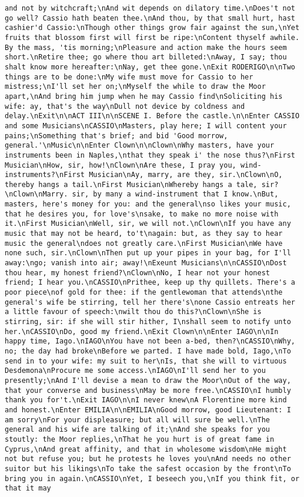 \begin{verbatim}
and not by witchcraft;\nAnd wit depends on dilatory time.\nDoes't not go well? Cassio hath beaten thee.\nAnd thou, by that small hurt, hast cashier'd Cassio:\nThough other things grow fair against the sun,\nYet fruits that blossom first will first be ripe:\nContent thyself awhile. By the mass, 'tis morning;\nPleasure and action make the hours seem short.\nRetire thee; go where thou art billeted:\nAway, I say; thou shalt know more hereafter:\nNay, get thee gone.\nExit RODERIGO\n\nTwo things are to be done:\nMy wife must move for Cassio to her mistress;\nI'll set her on;\nMyself the while to draw the Moor apart,\nAnd bring him jump when he may Cassio find\nSoliciting his wife: ay, that's the way\nDull not device by coldness and delay.\nExit\n\nACT III\n\nSCENE I. Before the castle.\n\nEnter CASSIO and some Musicians\nCASSIO\nMasters, play here; I will content your pains;\nSomething that's brief; and bid 'Good morrow, general.'\nMusic\n\nEnter Clown\n\nClown\nWhy masters, have your instruments been in Naples,\nthat they speak i' the nose thus?\nFirst Musician\nHow, sir, how!\nClown\nAre these, I pray you, wind-instruments?\nFirst Musician\nAy, marry, are they, sir.\nClown\nO, thereby hangs a tail.\nFirst Musician\nWhereby hangs a tale, sir?\nClown\nMarry. sir, by many a wind-instrument that I know.\nBut, masters, here's money for you: and the general\nso likes your music, that he desires you, for love's\nsake, to make no more noise with it.\nFirst Musician\nWell, sir, we will not.\nClown\nIf you have any music that may not be heard, to't\nagain: but, as they say to hear music the general\ndoes not greatly care.\nFirst Musician\nWe have none such, sir.\nClown\nThen put up your pipes in your bag, for I'll away:\ngo; vanish into air; away!\nExeunt Musicians\n\nCASSIO\nDost thou hear, my honest friend?\nClown\nNo, I hear not your honest friend; I hear you.\nCASSIO\nPrithee, keep up thy quillets. There's a poor piece\nof gold for thee: if the gentlewoman that attends\nthe general's wife be stirring, tell her there's\none Cassio entreats her a little favour of speech:\nwilt thou do this?\nClown\nShe is stirring, sir: if she will stir hither, I\nshall seem to notify unto her.\nCASSIO\nDo, good my friend.\nExit Clown\n\nEnter IAGO\n\nIn happy time, Iago.\nIAGO\nYou have not been a-bed, then?\nCASSIO\nWhy, no; the day had broke\nBefore we parted. I have made bold, Iago,\nTo send in to your wife: my suit to her\nIs, that she will to virtuous Desdemona\nProcure me some access.\nIAGO\nI'll send her to you presently;\nAnd I'll devise a mean to draw the Moor\nOut of the way, that your converse and business\nMay be more free.\nCASSIO\nI humbly thank you for't.\nExit IAGO\n\nI never knew\nA Florentine more kind and honest.\nEnter EMILIA\n\nEMILIA\nGood morrow, good Lieutenant: I am sorry\nFor your displeasure; but all will sure be well.\nThe general and his wife are talking of it;\nAnd she speaks for you stoutly: the Moor replies,\nThat he you hurt is of great fame in Cyprus,\nAnd great affinity, and that in wholesome wisdom\nHe might not but refuse you; but he protests he loves you\nAnd needs no other suitor but his likings\nTo take the safest occasion by the front\nTo bring you in again.\nCASSIO\nYet, I beseech you,\nIf you think fit, or that it may 
\end{verbatim}
